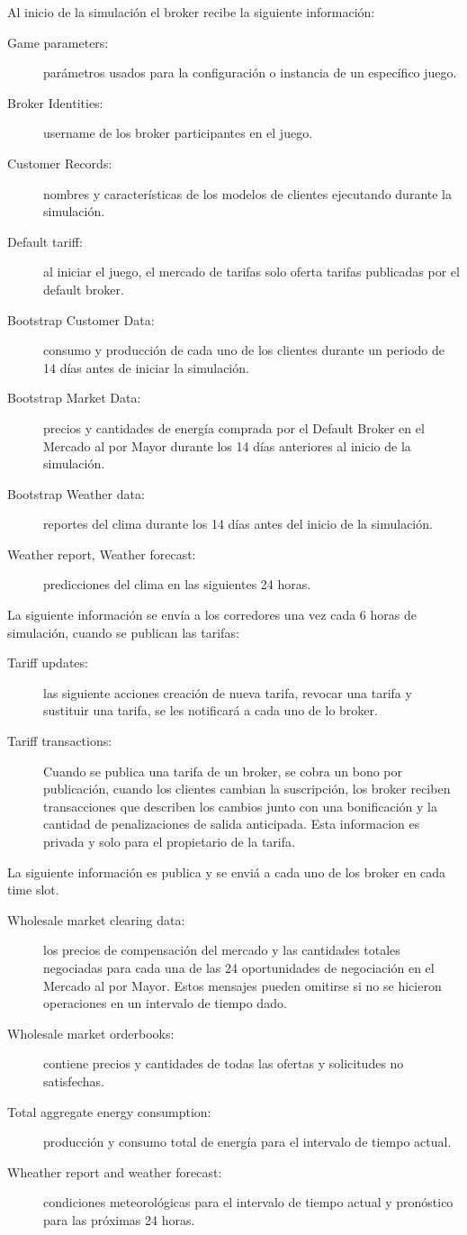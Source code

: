 Al inicio de la simulación el broker recibe la siguiente información:
\begin{description}
	\item [Game parameters: ]parámetros usados para la configuración o instancia de un específico juego.    
	\item [Broker Identities: ]username de los broker participantes en el juego.
	\item [Customer Records: ]nombres y características de los modelos de clientes ejecutando durante la simulación.
	\item [Default tariff: ]al iniciar el juego, el mercado de tarifas solo oferta tarifas publicadas por el default broker.
	\item [Bootstrap Customer Data: ]consumo y producción de cada uno de los clientes durante un periodo de 14 días antes de iniciar la simulación.
	\item [Bootstrap Market Data: ]precios y cantidades de energía comprada por el Default Broker en el Mercado al por Mayor durante los 14 días anteriores al inicio de la simulación.
	\item [Bootstrap Weather data: ]reportes del clima durante los 14 días antes del inicio de la simulación.
	\item [Weather report, Weather forecast: ]predicciones del clima en las siguientes 24 horas.  
\end{description}
La siguiente información se envía a los corredores una vez cada 6 horas de simulación, cuando se publican las tarifas:
\begin{description}
	\item [Tariff updates: ]las siguiente acciones creación de nueva tarifa, revocar una tarifa y sustituir una tarifa, se les notificará a cada uno de lo broker.
	\item [Tariff transactions:] Cuando se publica una tarifa de un broker, se  cobra un bono por publicación, cuando los clientes  cambian la suscripción, los broker reciben transacciones que describen los cambios junto con una bonificación y la cantidad de penalizaciones de salida anticipada. Esta informacion es privada y solo para el propietario de la tarifa.
\end{description}
La siguiente información es publica y se enviá a cada uno de los broker en cada time slot.
\begin{description}
	\item [Wholesale market clearing data: ]los precios de compensación del mercado y las cantidades totales negociadas para cada una de las 24 oportunidades de negociación en el Mercado al por Mayor. Estos mensajes pueden omitirse si no se hicieron operaciones en un intervalo de tiempo dado.
	\item [Wholesale market orderbooks: ]contiene precios y cantidades de todas las ofertas y solicitudes no satisfechas.
	\item [Total aggregate energy consumption: ]producción y consumo total de energía para el intervalo de tiempo actual.
	\item [Wheather report and weather forecast:] condiciones meteorológicas para el intervalo de tiempo actual y pronóstico para las próximas 24 horas.
\end{description}
